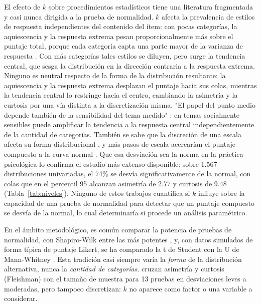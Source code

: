 \documentclass[man,mask,donotrepeattitle,floatsintext]{apa7}
\begin{document}
El efecto de $k$ sobre procedimientos estadísticos tiene una literatura fragmentada y casi nunca dirigida a la prueba de normalidad. $k$ afecta la prevalencia de estilos de respuesta independientes del contenido del ítem: con pocas categorías, la aquiescencia y la respuesta extrema pesan proporcionalmente más sobre el puntaje total, porque cada categoría capta una parte mayor de la varianza de respuesta \parencite{weijters2010}. Con más categorías tales estilos se diluyen, pero surge la tendencia central, que sesga la distribución en la dirección contraria a la respuesta extrema. Ninguno es neutral respecto de la forma de la distribución resultante: la aquiescencia y la respuesta extrema desplazan el puntaje hacia sus colas, mientras la tendencia central lo restringe hacia el centro, cambiando la asimetría y la curtosis por una vía distinta a la discretización misma. "El papel del punto medio depende también de la sensibilidad del tema medido" \parencite[, párr.~6]{kurtulus2026}: en temas socialmente sensibles puede amplificar la tendencia a la respuesta central independientemente de la cantidad de categorías. También se sabe que la discreción de una escala afecta su forma distribucional \parencite{ho2015,sathyanarayana2026}, y más pasos de escala acercarían el puntaje compuesto a la curva normal \parencite{viljoen2015}. Que esa desviación sea la norma en la práctica psicológica lo confirma el estudio más extenso disponible: sobre 1.567 distribuciones univariadas, el 74\% se desvía significativamente de la normal, con colas que en el percentil 95 alcanzan asimetría de 2.77 y curtosis de 9.48 \parencite{cain2017} (Tabla~\ref{tab:niveles}). Ninguno de estos trabajos cuantifica si $k$ influye sobre la capacidad de una prueba de normalidad para detectar que un puntaje compuesto se desvía de la normal, lo cual determinaría si procede un análisis paramétrico.

En el ámbito metodológico, es común comparar la potencia de pruebas de normalidad, con Shapiro-Wilk entre las más potentes \parencite{razali2011,shapirowilk1965,yap2011}, y, con datos simulados de forma típica de puntaje Likert, se ha comparado la t de Student con la U de Mann-Whitney \parencite{matamoros2026}. Esta tradición casi siempre varía la \emph{forma} de la distribución alternativa, nunca la \emph{cantidad de categorías}. \textcite{kamath2025} cruzan asimetría y curtosis (Fleishman) con el tamaño de muestra para 13 pruebas en desviaciones leves a moderadas, pero tampoco discretizan: $k$ no aparece como factor o una variable a considerar.
\end{document}
